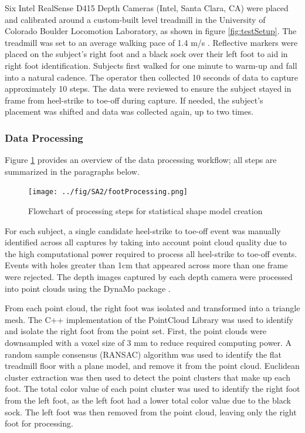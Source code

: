 \documentclass[defaultstyle,11pt]{thesis}
\begin{document}
Six Intel RealSense D415 Depth Cameras (Intel, Santa Clara, CA) were placed and calibrated around a custom-built level treadmill in the University of Colorado Boulder Locomotion Laboratory, as shown in figure \ref{fig:testSetup}.
The treadmill was set to an average walking pace of 1.4 m/s \citep{Browning2006}.
Reflective markers were placed on the subject's right foot and a black sock over their left foot to aid in right foot identification.
Subjects first walked for one minute to warm-up and fall into a natural cadence.
The operator then collected 10 seconds of data to capture approximately 10 steps.
The data were reviewed to ensure the subject stayed in frame from heel-strike to toe-off during capture. If needed, the subject's placement was shifted and data was collected again, up to two times.

\hypertarget{data-processing}{%
\subsubsection{Data Processing}\label{data-processing}}

Figure \ref{fig:dataflow} provides an overview of the data processing workflow; all steps are summarized in the paragraphs below.

\begin{figure}
\hypertarget{fig:dataflow}{%
\centering
\texttt{[image: ../fig/SA2/footProcessing.png]}
\caption{Flowchart of processing steps for statistical shape model creation}\label{fig:dataflow}
}
\end{figure}

For each subject, a single candidate heel-strike to toe-off event was manually identified across all captures by taking into account point cloud quality due to the high computational power required to process all heel-strike to toe-off events.
Events with holes greater than 1cm that appeared across more than one frame were rejected.
The depth images captured by each depth camera were processed into point clouds using the DynaMo package \citep{Boppana2019}.

From each point cloud, the right foot was isolated and transformed into a triangle mesh.
The C++ implementation of the PointCloud Library \citep{Rusu2011} was used to identify and isolate the right foot from the point set.
First, the point clouds were downsampled with a voxel size of 3 mm to reduce required computing power.
A random sample consensus (RANSAC) algorithm \citep{Fischler1981} was used to identify the flat treadmill floor with a plane model, and remove it from the point cloud.
Euclidean cluster extraction was then used to detect the point clusters that make up each foot.
The total color value of each point cluster was used to identify the right foot from the left foot, as the left foot had a lower total color value due to the black sock.
The left foot was then removed from the point cloud, leaving only the right foot for processing.
\end{document}
